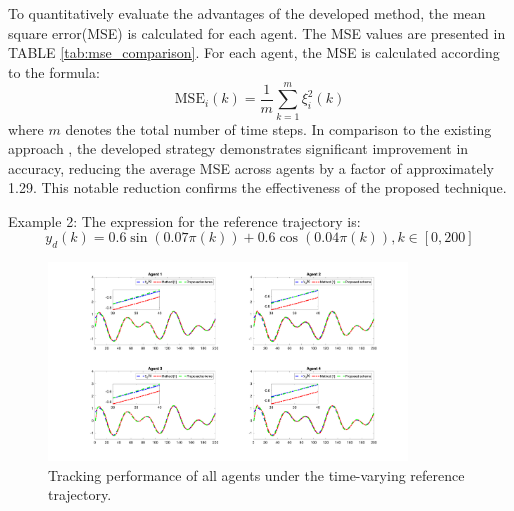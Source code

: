 \documentclass[journal,onecolumn]{IEEEtran}
\begin{document}
\begin{table}[H]
    \centering
    \caption{Mean square error comparison (Example 1)}
    \label{tab:mse_comparison}
\end{table}


To quantitatively evaluate the advantages of the developed method, the mean square error(MSE) is calculated for each agent. The MSE values are presented in TABLE \ref{tab:mse_comparison}. For each agent, the MSE is calculated according to the formula: \[
\text{MSE}_{i}(k) = \frac{1}{m} \sum_{k=1}^{m} \xi^2_{i}(k)
\] where $ m $  denotes the total number of time steps. In comparison to the existing approach \cite{1}, the developed strategy demonstrates significant improvement in accuracy, reducing the average MSE across agents by a factor of approximately 1.29. This notable reduction confirms the effectiveness of the proposed technique.

\pagebreak

Example 2: The expression for the reference trajectory is:
\[ y_d(k)=0.6\sin(0.07\pi(k))+0.6\cos(0.04\pi(k)), k \in [0, 200] \]

\begin{figure}[H]
    \centering
    \includegraphics[width=0.85\textwidth]{var_tracking.png}
    \caption{Tracking performance of all agents under the time-varying reference trajectory.}
    \label{fig:tracking_var} %
\end{figure}
\end{document}
